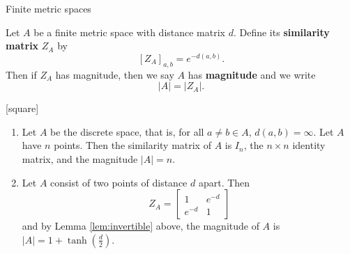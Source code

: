 \documentclass[12pt]{beamer}
\begin{document}
\begin{frame}[allowframebreaks]{Finite metric spaces}

\begin{definition}
Let $A$ be a finite metric space with distance matrix $d$. Define its \textbf{similarity matrix} $Z_A$ by
\begin{equation*}
\left[Z_A\right]_{a,b} = e^{-d(a,b)}.
\end{equation*}
Then if $Z_A$ has magnitude, then we say $A$ has \textbf{magnitude} and we write
\begin{equation*}
\vert A \vert = \vert Z_A \vert.
\end{equation*}
\end{definition}

\framebreak

\begin{example}
[square]
\begin{enumerate}
\item Let $A$ be the discrete space, that is, for all $a\neq b \in A$, $d(a,b) = \infty$. Let $A$ have $n$ points. Then the similarity matrix of $A$ is $I_n$, the $n\times n$ identity matrix, and the magnitude $\vert A \vert = n$.
\item Let $A$ consist of two points of distance $d$ apart. Then
\begin{equation*}
Z_A = \begin{bmatrix} 1 & e^{-d} \\ e^{-d} & 1 \end{bmatrix}
\end{equation*}
and by Lemma \ref{lem:invertible} above, the magnitude of $A$ is $\vert A \vert = 1 + \tanh\left(\frac{d}{2}\right)$.
\end{enumerate}
\end{example}

\end{frame}
\end{document}
